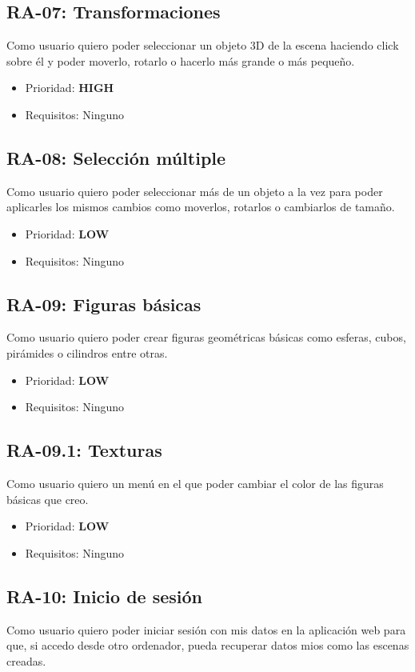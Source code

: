 \subsection{RA-07: Transformaciones}
Como usuario quiero poder seleccionar un objeto 3D de la escena haciendo click sobre él y poder moverlo, rotarlo o hacerlo más grande o más pequeño.
\begin{itemize}
    \item Prioridad: \textbf{HIGH}
    \item Requisitos: Ninguno
\end{itemize}

\subsection{RA-08: Selección múltiple}
Como usuario quiero poder seleccionar más de un objeto a la vez para poder aplicarles los mismos cambios como moverlos, rotarlos o cambiarlos de tamaño.

\begin{itemize}
    \item Prioridad: \textbf{LOW}
    \item Requisitos: Ninguno
\end{itemize}

\subsection{RA-09: Figuras básicas}
Como usuario quiero poder crear figuras geométricas básicas como esferas, cubos, pirámides o cilindros entre otras.

\begin{itemize}
    \item Prioridad: \textbf{LOW}
    \item Requisitos: Ninguno
\end{itemize}

\subsection{RA-09.1: Texturas}
Como usuario quiero un menú en el que poder cambiar el color de las figuras básicas que creo.

\begin{itemize}
    \item Prioridad: \textbf{LOW}
    \item Requisitos: Ninguno
\end{itemize}

\subsection{RA-10: Inicio de sesión}
Como usuario quiero poder iniciar sesión con mis datos en la aplicación web para que, si accedo desde otro ordenador, pueda recuperar datos mios como las escenas creadas.

